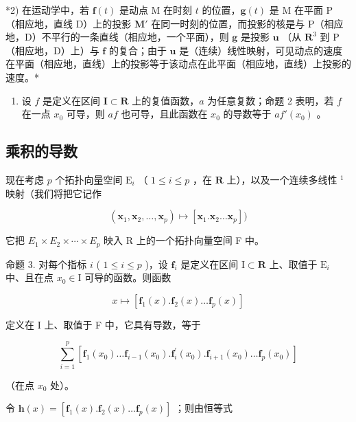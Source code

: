 *2) 在运动学中，若 \(\mathbf{f}(t)\) 是动点 M 在时刻 \(t\) 的位置，\(\mathbf{g}(t)\) 是 M 在平面 P（相应地，直线 D）上的投影 \(\mathbf{M}'\) 在同一时刻的位置，而投影的核是与 P（相应地，D）不平行的一条直线（相应地，一个平面），则 \(\mathbf{g}\) 是投影 \(\mathbf{u}\) （从 \(\mathbf{R}^3\) 到 P（相应地，D）上）与 \(\mathbf{f}\) 的复合；由于 \(\mathbf{u}\) 是（连续）线性映射，可见动点的速度在平面（相应地，直线）上的投影等于该动点在此平面（相应地，直线）上投影的速度。*

\begin{enumerate}
\def\labelenumi{\arabic{enumi})}
\setcounter{enumi}{2}
\tightlist
\item
  设 \(f\) 是定义在区间 \(\mathbf{I} \subset \mathbf{R}\) 上的复值函数，\(a\) 为任意复数；命题 2 表明，若 \(f\) 在一点 \(x_0\) 可导，则 \(af\) 也可导，且此函数在 \(x_0\) 的导数等于 \(af'(x_0)\) 。
\end{enumerate}

\subsection{乘积的导数}

现在考虑 \(p\) 个拓扑向量空间 \(\mathrm{E}_i\) （ \(1 \leqslant i \leqslant p\) ，在 \(\mathbf{R}\) 上），以及一个连续多线性 \(^1\) 映射（我们将把它记作

\[
\left(\mathbf {x} _ {1}, \mathbf {x} _ {2}, \dots , \mathbf {x} _ {p}\right) \mapsto \left[ \mathbf {x} _ {1}. \mathbf {x} _ {2} \dots \mathbf {x} _ {p} \right])
\]

它把 \(E_{1} \times E_{2} \times \cdots \times E_{p}\) 映入 R 上的一个拓扑向量空间 F 中。

命题 3. 对每个指标 \(i\) ( \(1 \leqslant i \leqslant p\) )，设 \(\mathbf{f}_i\) 是定义在区间 \(\mathrm{I} \subset \mathbf{R}\) 上、取值于 \(\mathrm{E}_i\) 中、且在点 \(x_0 \in \mathrm{I}\) 可导的函数。则函数

\[
x \mapsto [ \mathbf {f} _ {1} (x). \mathbf {f} _ {2} (x) \dots \mathbf {f} _ {p} (x) ]
\]

定义在 I 上、取值于 F 中，它具有导数，等于

\[
\sum_ {i = 1} ^ {p} \left[ \mathbf {f} _ {1} (x _ {0}) \dots \mathbf {f} _ {i - 1} (x _ {0}). \mathbf {f} _ {i} ^ {\prime} (x _ {0}). \mathbf {f} _ {i + 1} (x _ {0}) \dots \mathbf {f} _ {p} (x _ {0}) \right]\tag{1}
\]

（在点 \(x_0\) 处）。

令 \(\mathbf{h}(x) = [\mathbf{f}_1(x).\mathbf{f}_2(x)\dots \mathbf{f}_p(x)]\) ；则由恒等式


